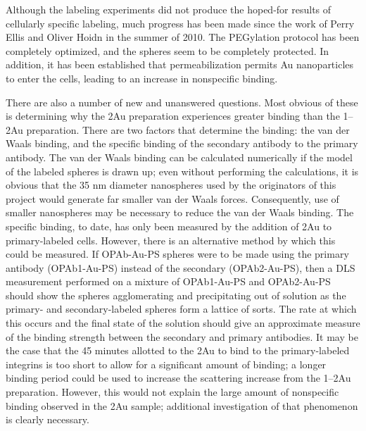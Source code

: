 Although the labeling experiments did not produce the hoped-for results of cellularly specific labeling, much progress has been made since the work of Perry Ellis and Oliver Hoidn in the summer of 2010. The PEGylation protocol has been completely optimized, and the spheres seem to be completely protected. In addition, it has been established that permeabilization permits Au nanoparticles to enter the cells, leading to an increase in nonspecific binding.

There are also a number of new and unanswered questions. Most obvious of these is determining why the 2Au preparation experiences greater binding than the 1--2Au preparation. There are two factors that determine the binding: the van der Waals binding, and the specific binding of the secondary antibody to the primary antibody. The van der Waals binding can be calculated numerically if the model of the labeled spheres is drawn up; even without performing the calculations, it is obvious that the 35 nm diameter nanospheres used by the originators of this project would generate far smaller van der Waals forces. Consequently, use of smaller nanospheres may be necessary to reduce the van der Waals binding. The specific binding, to date, has only been measured by the addition of 2Au to primary-labeled cells. However, there is an alternative method by which this could be measured. If OPAb-Au-PS spheres were to be made using the primary antibody (OPAb1-Au-PS) instead of the secondary (OPAb2-Au-PS), then a DLS measurement performed on a mixture of OPAb1-Au-PS and OPAb2-Au-PS should show the spheres agglomerating and precipitating out of solution as the primary- and secondary-labeled spheres form a lattice of sorts. The rate at which this occurs and the final state of the solution should give an approximate measure of the binding strength between the secondary and primary antibodies. It may be the case that the 45 minutes allotted to the 2Au to bind to the primary-labeled integrins is too short to allow for a significant amount of binding; a longer binding period could be used to increase the scattering increase from the 1--2Au preparation. However, this would not explain the large amount of nonspecific binding observed in the 2Au sample; additional investigation of that phenomenon is clearly necessary.
